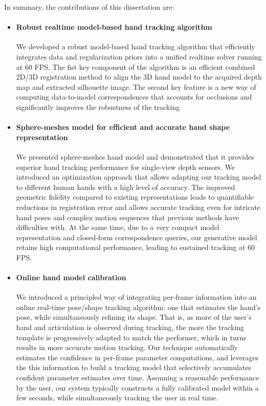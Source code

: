 In summary, the contributions of this dissertation are:
\begin{itemize}

\item \paragraph{Robust realtime model-based hand tracking algorithm}
We developed a robust model-based hand tracking algorithm that efficiently integrates data and regularization priors into a unified realtime solver running at 60 FPS. The fist key component of the algorithm is an efficient combined 2D/3D registration method to align the 3D hand model to the acquired depth map and extracted silhouette image. The second key feature is a new way of computing data-to-model correspondences that accounts for occlusions and significantly improves the robustness of the tracking

\item \paragraph{Sphere-meshes model for efficient and accurate hand shape representation}
We presented sphere-meshes hand model and demonstrated that it provides superior hand tracking performance for single-view depth sensors. We introduced an optimization approach that allows adapting our tracking model to different human hands with a high level of accuracy. The improved geometric fidelity compared to existing representations leads to quantifiable reductions in registration error and allows accurate tracking even for intricate hand poses and complex motion sequences that previous methods have difficulties with. At the same time, due to a very compact model representation and closed-form correspondence queries, our generative model retains high computational performance, leading to sustained tracking at 60 FPS.

\item \paragraph{Online hand model calibration} 
We introduced a principled way of integrating per-frame information into an online real-time pose/shape tracking algorithm: one that estimates the hand’s pose, while simultaneously refining its shape. That is, as more of the user’s hand and articulation is observed during tracking, the more the tracking template is progressively adapted to match the performer, which in turns results in more accurate motion tracking. Our technique automatically estimates the confidence in per-frame parameter computations, and leverages the this information to build a tracking model that selectively accumulates confident parameter estimates over time. Assuming a reasonable performance by the user, our system typically constructs a fully calibrated model within a few seconds, while simultaneously tracking the user in real time. 


\end{itemize}
